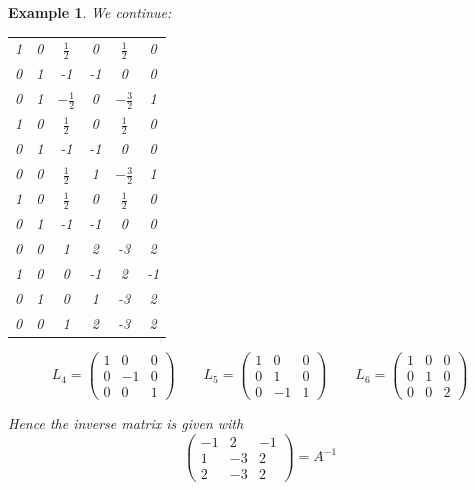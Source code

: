 \documentclass[a4paper,landscape,twocolumn]{article}
\newtheorem{ex}{Example}[section]
\begin{document}
\begin{ex}
  We continue:
  \begin{tabular}{ccc|ccc}
      1 & 0 & $\frac12$ & 0 & $\frac12$ & 0 \\
      0 & 1 & -1 & -1 & 0 & 0 \\
      0 & 1 & $-\frac12$ & 0 & $-\frac32$ & 1 \\
    \hline
      1 & 0 & $\frac12$ & 0 & $\frac12$ & 0 \\
      0 & 1 & -1 & -1 & 0 & 0 \\
      0 & 0 & $\frac12$ & 1 & $-\frac32$ & 1 \\
    \hline
      1 & 0 & $\frac12$ & 0 & $\frac12$ & 0 \\
      0 & 1 & -1 & -1 & 0 & 0 \\
      0 & 0 & 1 & 2 & -3 & 2 \\
    \hline
      1 & 0 & 0 & -1 & 2 & -1 \\
      0 & 1 & 0 & 1 & -3 & 2 \\
      0 & 0 & 1 & 2 & -3 & 2
  \end{tabular}
  \[
    L_4 = \begin{pmatrix}
      1 &  0 & 0 \\
      0 & -1 & 0 \\
      0 &  0 & 1
    \end{pmatrix}
    \qquad
    L_5 = \begin{pmatrix}
      1 &  0 & 0 \\
      0 &  1 & 0 \\
      0 & -1 & 1
    \end{pmatrix}
    \qquad
    L_6 = \begin{pmatrix}
      1 & 0 & 0 \\
      0 & 1 & 0 \\
      0 & 0 & 2
    \end{pmatrix}
  \]

  Hence the inverse matrix is given with
  \[
    \begin{pmatrix}
      -1 & 2 & -1 \\
       1 & -3 & 2 \\
       2 & -3 & 2
    \end{pmatrix}
    = A^{-1}
  \]
\end{ex}
\end{document}
